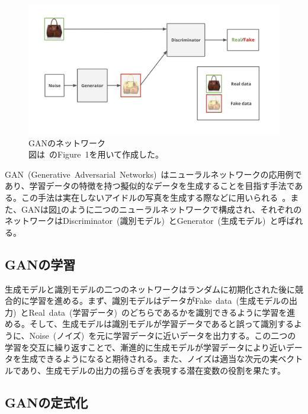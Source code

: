 \begin{figure}[b]
\begin{center}
\includegraphics[width=\hsize]{figure/GAN_net.png}
\caption{GANのネットワーク\\
図は~\cite{pix2pix}のFigure~1を用いて作成した。}
\label{fig:GAN_net}
\end{center}
\end{figure}

GAN~(Generative~Adversarial~Networks)~\cite{GAN}はニューラルネットワークの応用例であり、学習データの特徴を持つ擬似的なデータを生成することを目指す手法である。この手法は実在しないアイドルの写真を生成する際などに用いられる~\cite{idol}。また、GANは図\ref{fig:GAN_net}のように二つのニューラルネットワークで構成され、それぞれのネットワークはDiscriminator~(識別モデル)~とGenerator~(生成モデル)~と呼ばれる。

\subsection{GANの学習}

生成モデルと識別モデルの二つのネットワークはランダムに初期化された後に競合的に学習を進める。まず、識別モデルはデータがFake~data~(生成モデルの出力)~とReal~data~(学習データ)~のどちらであるかを識別できるように学習を進める。そして、生成モデルは識別モデルが学習データであると誤って識別するように、Noise~(ノイズ)~を元に学習データに近いデータを出力する。この二つの学習を交互に繰り返すことで、漸進的に生成モデルが学習データにより近いデータを生成できるようになると期待される。また、ノイズは適当な次元の実ベクトルであり、生成モデルの出力の揺らぎを表現する潜在変数の役割を果たす。

\clearpage

\subsection{GANの定式化}

